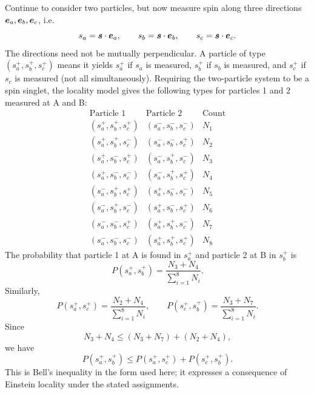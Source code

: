 Continue to consider two particles, but now measure spin along three directions $\bm{e}_a,\bm{e}_b,\bm{e}_c$, i.e.
\begin{equation}
s_a=\bm{s}\cdot\bm{e}_a,\qquad s_b=\bm{s}\cdot\bm{e}_b,\qquad
s_c=\bm{s}\cdot\bm{e}_c.
\end{equation}
The directions need not be mutually perpendicular. A particle of type $(s_a^+,s_b^+,s_c^+)$ means it yields $s_a^+$ if $s_a$ is measured, $s_b^+$ if $s_b$ is measured, and $s_c^+$ if $s_c$ is measured (not all simultaneously). Requiring the two-particle system to be a spin singlet, the locality model gives the following types for particles 1 and 2 measured at A and B:
\begin{equation}
\begin{array}{c|c|c}
\text{Particle 1}&\text{Particle 2}&\text{Count}\\\hline
(s_a^+,s_b^+,s_c^+)&(s_a^-,s_b^-,s_c^-)&N_1\\
(s_a^+,s_b^+,s_c^-)&(s_a^-,s_b^-,s_c^+)&N_2\\
(s_a^+,s_b^-,s_c^+)&(s_a^-,s_b^+,s_c^-)&N_3\\
(s_a^+,s_b^-,s_c^-)&(s_a^-,s_b^+,s_c^+)&N_4\\
(s_a^-,s_b^+,s_c^+)&(s_a^+,s_b^-,s_c^-)&N_5\\
(s_a^-,s_b^+,s_c^-)&(s_a^+,s_b^-,s_c^+)&N_6\\
(s_a^-,s_b^-,s_c^+)&(s_a^+,s_b^+,s_c^-)&N_7\\
(s_a^-,s_b^-,s_c^-)&(s_a^+,s_b^+,s_c^+)&N_8
\end{array}
\end{equation}
The probability that particle 1 at A is found in $s_a^+$ and particle 2 at B in $s_b^+$ is
\begin{equation}
P(s_a^+,s_b^+)=\frac{N_3+N_4}{\sum_{i=1}^8N_i}.
\end{equation}
Similarly,
\begin{equation}
P(s_a^+,s_c^+)=\frac{N_2+N_4}{\sum_{i=1}^8N_i},\qquad
P(s_c^+,s_b^+)=\frac{N_3+N_7}{\sum_{i=1}^8N_i}.
\end{equation}
Since
\begin{equation}
N_3+N_4\le (N_3+N_7)+(N_2+N_4),
\end{equation}
we have
\begin{equation}
\boxed{P(s_a^+,s_b^+)\le P(s_a^+,s_c^+)+P(s_c^+,s_b^+).}
\end{equation}
This is Bell's inequality in the form used here; it expresses a consequence of Einstein locality under the stated assignments.

